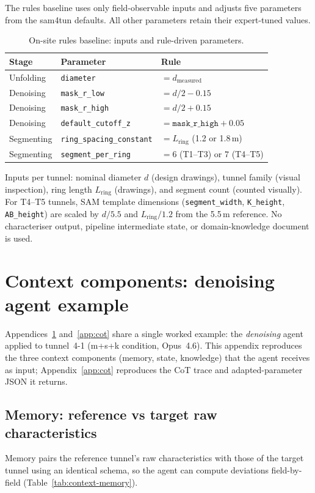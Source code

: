 The rules baseline uses only field-observable inputs and adjusts five parameters from the sam4tun defaults. All other parameters retain their expert-tuned values.

\begin{table}[ht]
\caption{On-site rules baseline: inputs and rule-driven parameters.}\label{tab:rules-spec}
\begin{tabular*}{\tblwidth}{@{} l l l @{}}
\toprule
Stage & Parameter & Rule \\
\midrule
Unfolding & \texttt{diameter} & $= d_{\mathrm{measured}}$ \\
Denoising & \texttt{mask\_r\_low} & $= d/2 - 0.15$ \\
Denoising & \texttt{mask\_r\_high} & $= d/2 + 0.15$ \\
Denoising & \texttt{default\_cutoff\_z} & $= \texttt{mask\_r\_high} + 0.05$ \\
Segmenting & \texttt{ring\_spacing\_constant} & $= L_{\mathrm{ring}}$ (1.2 or 1.8\,m) \\
Segmenting & \texttt{segment\_per\_ring} & $= 6$ (T1--T3) or $7$ (T4--T5) \\
\bottomrule
\end{tabular*}
\end{table}

\noindent Inputs per tunnel: nominal diameter $d$ (design drawings), tunnel family (visual inspection), ring length $L_{\mathrm{ring}}$ (drawings), and segment count (counted visually). For T4--T5 tunnels, SAM template dimensions (\texttt{segment\_width}, \texttt{K\_height}, \texttt{AB\_height}) are scaled by $d/5.5$ and $L_\mathrm{ring}/1.2$ from the 5.5\,m reference. No characteriser output, pipeline intermediate state, or domain-knowledge document is used.

\section{Context components: denoising agent example}\label{app:context}

Appendices~\ref{app:context} and~\ref{app:cot} share a single worked example: the \emph{denoising} agent applied to tunnel~4-1 (m+s+k condition, Opus~4.6). This appendix reproduces the three context components (memory, state, knowledge) that the agent receives as input; Appendix~\ref{app:cot} reproduces the CoT trace and adapted-parameter JSON it returns.

\subsection{Memory: reference vs target raw characteristics}\label{app:context-memory}
Memory pairs the reference tunnel's raw characteristics with those of the target tunnel using an identical schema, so the agent can compute deviations field-by-field (Table~\ref{tab:context-memory}).

